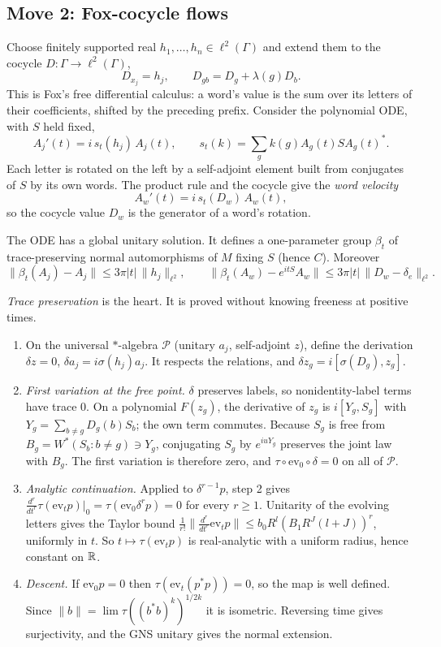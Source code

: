 \subsection{Move 2: Fox-cocycle flows}
Choose finitely supported real $h_1,\dots,h_n\in\ell^2(\Gamma)$ and extend them to the cocycle $D:\Gamma\to\ell^2(\Gamma)$,
\[
D_{x_j}=h_j,\qquad D_{gb}=D_g+\lambda(g)D_b .
\]
This is Fox's free differential calculus: a word's value is the sum over its letters of their coefficients, shifted by the preceding prefix.
Consider the polynomial ODE, with $S$ held fixed,
\[
A_j'(t)=i\,s_t(h_j)\,A_j(t),\qquad s_t(k)=\sum_gk(g)A_g(t)SA_g(t)^* .
\]
Each letter is rotated on the left by a self-adjoint element built from conjugates of $S$ by its own words. The product rule and the cocycle give
the \emph{word velocity}
\[
A_w'(t)=i\,s_t(D_w)\,A_w(t),
\]
so the cocycle value $D_w$ is the generator of a word's rotation.
\begin{proposition}
The ODE has a global unitary solution. It defines a one-parameter group $\beta_t$ of trace-preserving normal automorphisms of $M$ fixing $S$ (hence
$C$). Moreover
\[
\|\beta_t(A_j)-A_j\|\le3\pi|t|\,\|h_j\|_{\ell^2},\qquad \|\beta_t(A_w)-e^{itS}A_w\|\le3\pi|t|\,\|D_w-\delta_e\|_{\ell^2}.
\]
\end{proposition}
\emph{Trace preservation} is the heart. It is proved without knowing freeness at positive times.
\begin{enumerate}[leftmargin=*]
\item On the universal $*$-algebra $\mathcal P$ (unitary $a_j$, self-adjoint $z$), define the derivation $\delta z=0$, $\delta a_j=i\sigma(h_j)a_j$. It respects the
relations, and $\delta z_g=i[\sigma(D_g),z_g]$.
\item \emph{First variation at the free point.} $\delta$ preserves labels, so nonidentity-label terms have trace $0$. On a polynomial $F(z_g)$, the derivative
of $z_g$ is $i[Y_g,S_g]$ with $Y_g=\sum_{b\ne g}D_g(b)S_b$; the own term commutes. Because $S_g$ is free from $B_g=W^*(S_b:b\ne g)\ni Y_g$, conjugating $S_g$ by
$e^{iuY_g}$ preserves the joint law with $B_g$. The first variation is therefore zero, and $\tau\circ\mathrm{ev}_0\circ\delta=0$ on all of $\mathcal P$.
\item \emph{Analytic continuation.} Applied to $\delta^{r-1}p$, step 2 gives $\frac{d^r}{dt^r}\tau(\mathrm{ev}_t p)|_0=\tau(\mathrm{ev}_0\delta^rp)=0$ for every $r\ge1$. Unitarity of the
evolving letters gives the Taylor bound $\frac1{r!}\|\frac{d^r}{dt^r}\mathrm{ev}_tp\|\le b_0R^l(B_1R^J(l+J))^r$, uniformly in $t$. So $t\mapsto\tau(\mathrm{ev}_tp)$ is real-analytic with a
uniform radius, hence constant on $\mathbb R$.
\item \emph{Descent.} If $\mathrm{ev}_0p=0$ then $\tau(\mathrm{ev}_t(p^*p))=0$, so the map is well defined. Since $\|b\|=\lim\tau((b^*b)^k)^{1/2k}$ it is isometric. Reversing time
gives surjectivity, and the GNS unitary gives the normal extension.
\end{enumerate}
